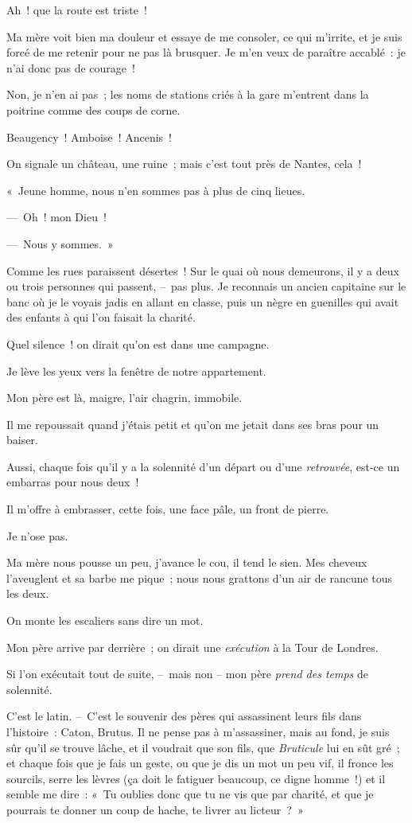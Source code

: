 \documentclass[french,twoside]{book} %
\begin{document}
\noindent Ah ! que la route est triste !\par
Ma mère voit bien ma douleur et essaye de me consoler, ce qui m’irrite, et je suis forcé de me retenir pour ne pas là brusquer. Je m’en veux de paraître accablé : je n’ai donc pas de courage !\par
Non, je n’en ai pas ; les noms de stations criés à la gare m’entrent dans la poitrine comme des coups de corne.\par
Beaugency ! Amboise ! Ancenis !\par
On signale un château, une ruine ; mais c’est tout près de Nantes, cela !\par
« Jeune homme, nous n’en sommes pas à plus de cinq lieues.\par
— Oh ! mon Dieu !\par
— Nous y sommes. »\par
\bigbreak
\noindent Comme les rues paraissent désertes ! Sur le quai où nous demeurons, il y a deux ou trois personnes qui passent, – pas plus. Je reconnais un ancien capitaine sur le banc où je le voyais jadis en allant en classe, puis un nègre en guenilles qui avait des enfants à qui l’on faisait la charité.\par
Quel silence ! on dirait qu’on est dans une campagne.\par
Je lève les yeux vers la fenêtre de notre appartement.\par
Mon père est là, maigre, l’air chagrin, immobile.\par
Il me repoussait quand j’étais petit et qu’on me jetait dans ses bras pour un baiser.\par
Aussi, chaque fois qu’il y a la solennité d’un départ ou d’une \emph{retrouvée}, est-ce un embarras pour nous deux !\par
Il m’offre à embrasser, cette fois, une face pâle, un front de pierre.\par
Je n’ose pas.\par
Ma mère nous pousse un peu, j’avance le cou, il tend le sien. Mes cheveux l’aveuglent et sa barbe me pique ; nous nous grattons d’un air de rancune tous les deux.\par
On monte les escaliers sans dire un mot.\par
Mon père arrive par derrière ; on dirait une \emph{exécution} à la Tour de Londres.\par
Si l’on exécutait tout de suite, – mais non – mon père \emph{prend des temps} de solennité.\par
C’est le latin. – C’est le souvenir des pères qui assassinent leurs fils dans l’histoire : Caton, Brutus. Il ne pense pas à m’assassiner, mais au fond, je suis sûr qu’il se trouve lâche, et il voudrait que son fils, que\emph{ Bruticule} lui en sût gré ; et chaque fois que je fais un geste, ou que je dis un mot un peu vif, il fronce les sourcils, serre les lèvres (ça doit le fatiguer beaucoup, ce digne homme !) et il semble me dire : « Tu oublies donc que tu ne vis que par charité, et que je pourrais te donner un coup de hache, te livrer au licteur ? »\par
\end{document}
